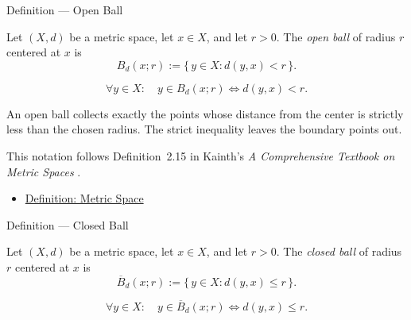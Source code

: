 \begin{definitionbox}{Definition --- Open Ball}
\begin{definition}\label{def:metric-open-ball}
Let \((X,d)\) be a metric space, let \(x\in X\), and let \(r>0\).  The
\emph{open ball} of radius \(r\) centered at \(x\) is
\[
  B_d(x;r)
  :=
  \{\,y\in X : d(y,x)<r\,\}.
\]
\end{definition}
\end{definitionbox}

\begin{remark*}
\[
\forall y\in X{:}\quad
y\in B_d(x;r)
\Longleftrightarrow
d(y,x)<r.
\]
\end{remark*}

\begin{remark*}[Interpretation]
An open ball collects exactly the points whose distance from the center is
strictly less than the chosen radius.  The strict inequality leaves the
boundary points out.
\end{remark*}

\begin{remark*}
This notation follows Definition~2.15 in Kainth's
\emph{A Comprehensive Textbook on Metric Spaces}
\cite{KainthComprehensiveMetricSpaces2023}.
\end{remark*}

\begin{dependencies}
\begin{itemize}
  \item \hyperref[def:metric-space]{Definition: Metric Space}
\end{itemize}
\end{dependencies}

\begin{definitionbox}{Definition --- Closed Ball}
\begin{definition}\label{def:metric-closed-ball}
Let \((X,d)\) be a metric space, let \(x\in X\), and let \(r>0\).  The
\emph{closed ball} of radius \(r\) centered at \(x\) is
\[
  \overline{B}_d(x;r)
  :=
  \{\,y\in X : d(y,x)\leq r\,\}.
\]
\end{definition}
\end{definitionbox}

\begin{remark*}
\[
\forall y\in X{:}\quad
y\in \overline{B}_d(x;r)
\Longleftrightarrow
d(y,x)\leq r.
\]
\end{remark*}

